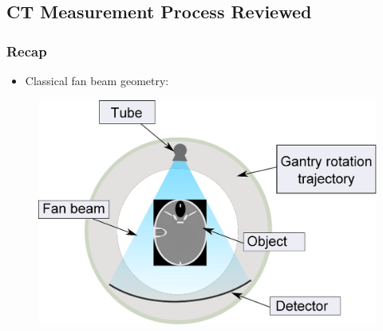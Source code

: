 


\subsection{CT Measurement Process Reviewed}

\begin{frame}
    \frametitle{Recap}
    \begin{itemize}
        \item Classical fan beam geometry:
    \end{itemize}
    \begin{figure}
        \centering{}
        \includegraphics[scale=0.35]{images/multict.eps}
    \end{figure}
\end{frame}

